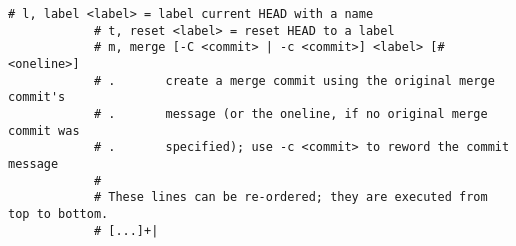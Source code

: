 \documentclass[usenames,svgnames,14pt]{beamer}
\begin{document}
\begin{frame}[c,fragile]
\begin{onlyenv}
\begin{lstlisting}[style=MyBash, basicstyle=\ttfamily\tiny\color{basic-color}, aboveskip=-4pt]
            # l, label <label> = label current HEAD with a name
            # t, reset <label> = reset HEAD to a label
            # m, merge [-C <commit> | -c <commit>] <label> [# <oneline>]
            # .       create a merge commit using the original merge commit's
            # .       message (or the oneline, if no original merge commit was
            # .       specified); use -c <commit> to reword the commit message
            #
            # These lines can be re-ordered; they are executed from top to bottom.
            # [...]+|
        \end{lstlisting}
    \end{onlyenv}
\end{frame}
\newsavebox{\savedTikZ}
\end{document}
